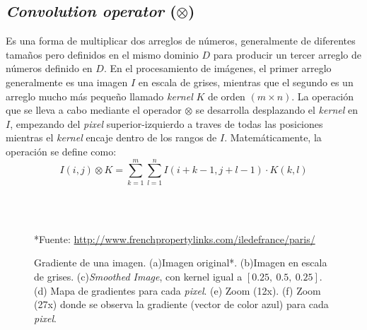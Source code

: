 \subsection{\textit{Convolution operator} ($\otimes$)}
Es una forma de multiplicar dos arreglos de números, generalmente de 
diferentes tamaños pero definidos en el mismo dominio $D$ para producir un 
tercer arreglo de números definido en $D$.
En el procesamiento de imágenes, el primer arreglo generalmente es una imagen
$I$ en escala de grises, mientras que el segundo es un arreglo mucho más
pequeño llamado \textit{kernel} $K$ de orden $(m \times n)$. La operación que 
se lleva a cabo mediante el operador $\otimes$ se desarrolla desplazando el 
\textit{kernel} en $I$, empezando del \textit{pixel} superior-izquierdo a 
traves de todas las posiciones mientras el \textit{kernel} encaje dentro de 
los rangos de $I$. Matemáticamente, la operación se define como:
\begin{equation}
  I(i, j) \otimes K = \sum_{k=1}^m \sum_{l=1}^n {I(i + k - 1, j + l - 1) \cdot K(k, l)}
\end{equation}

\begin{figure}[h!]
  \centering
   { }
   { }
   \\
   { }
   { }
   \\  
  \caption[Gradiente de una imagen]{Gradiente de una imagen. 
  (a)Imagen original*. (b)Imagen en escala de grises. (c)\textit{Smoothed
  Image}, con kernel igual a $[0.25,~ 0.5,~ 0.25]$. (d) Mapa de gradientes 
  para cada \textit{pixel}. (e) Zoom (12x). (f) Zoom (27x) donde se observa
  la gradiente (vector de color azul) para cada \textit{pixel}.}
  \tiny{*Fuente: \url{http://www.frenchpropertylinks.com/iledefrance/paris/}}
  \label{Fig:cap-marcoteorico:Paris-grad}
\end{figure}

